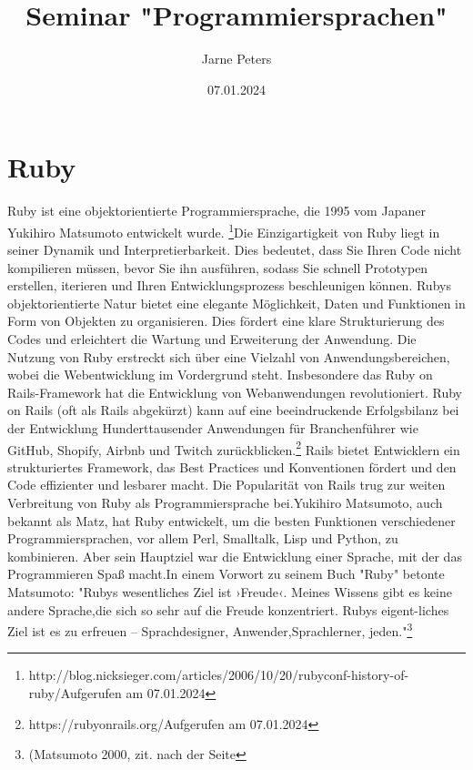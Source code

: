 \documentclass{article}
\title{Seminar "Programmiersprachen" }
\author{Jarne Peters}
\date{07.01.2024}
\begin{document}
\maketitle


\section*{Ruby}

Ruby ist eine objektorientierte Programmiersprache, die 1995 vom Japaner Yukihiro Matsumoto entwickelt wurde. \footnote{http://blog.nicksieger.com/articles/2006/10/20/rubyconf-history-of-ruby/Aufgerufen am 07.01.2024}Die Einzigartigkeit von Ruby liegt in seiner Dynamik und Interpretierbarkeit. Dies bedeutet, dass Sie Ihren Code nicht kompilieren müssen, bevor Sie ihn ausführen, sodass Sie schnell Prototypen erstellen, iterieren und Ihren Entwicklungsprozess beschleunigen können. Rubys objektorientierte Natur bietet eine elegante Möglichkeit, Daten und Funktionen in Form von Objekten zu organisieren. Dies fördert eine klare Strukturierung des Codes und erleichtert die Wartung und Erweiterung der Anwendung. Die Nutzung von Ruby erstreckt sich über eine Vielzahl von Anwendungsbereichen, wobei die Webentwicklung im Vordergrund steht. Insbesondere das Ruby on Rails-Framework hat die Entwicklung von Webanwendungen revolutioniert. Ruby on Rails (oft als Rails abgekürzt) kann auf eine beeindruckende Erfolgsbilanz bei der Entwicklung Hunderttausender Anwendungen für Branchenführer wie GitHub, Shopify, Airbnb und Twitch zurückblicken.\footnote{https://rubyonrails.org/Aufgerufen am 07.01.2024} Rails bietet Entwicklern ein strukturiertes Framework, das Best Practices und Konventionen fördert und den Code effizienter und lesbarer macht. Die Popularität von Rails trug zur weiten Verbreitung von Ruby als Programmiersprache bei.Yukihiro Matsumoto, auch bekannt als Matz, hat Ruby entwickelt, um die besten Funktionen verschiedener Programmiersprachen, vor allem Perl, Smalltalk, Lisp und Python, zu kombinieren. Aber sein Hauptziel war die Entwicklung einer Sprache, mit der das Programmieren Spaß macht.In einem Vorwort zu seinem Buch "Ruby" betonte Matsumoto: "Rubys wesentliches Ziel ist ›Freude‹. Meines Wissens gibt es keine andere Sprache,die sich so sehr auf die Freude konzentriert. Rubys eigent-liches Ziel ist es zu erfreuen – Sprachdesigner, Anwender,Sprachlerner, jeden."\footnote{(Matsumoto 2000, zit. nach der Seite
}
\end{document}
